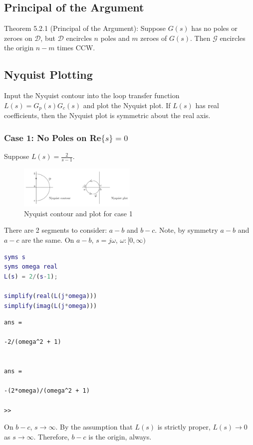 \documentclass[letterpaper,12pt]{article}
\begin{document}
\subsection{Principal of the Argument}
Theorem 5.2.1 (Principal of the Argument): Suppose $G(s)$ has no poles or zeroes on $\mathcal{D}$, but $\mathcal{D}$ encircles 
$n$ poles and $m$ zeroes of $G(s)$. Then $\mathcal{G}$ encircles the origin $n-m$ times CCW.

\subsection{Nyquist Plotting}
Input the Nyquist contour into the loop transfer function $L(s) = G_p(s) G_c(s)$ and plot the Nyquist plot. If $L(s)$ has real coefficients,
then the Nyquist plot is symmetric about the real axis.

\subsubsection{Case 1: No Poles on Re$\{s\} = 0$}
Suppose $L(s) = \frac{2}{s-1}$.
\begin{figure}[h]
    \centering
    \includegraphics[width=0.5\textwidth]{case1 nyquist plots.png}
    \caption{Nyquist contour and plot for case 1}
\end{figure}
There are 2 segments to consider: $a-b$ and $b-c$. Note, by symmetry $a-b$ and $a-c$ are the same. On $a-b$, $s= j\omega$, $\omega: [0, \infty)$ 
\begin{lstlisting}[language=Matlab]
syms s 
syms omega real
L(s) = 2/(s-1);

simplify(real(L(j*omega)))
simplify(imag(L(j*omega)))
\end{lstlisting}
\begin{verbatim}
ans =
 
-2/(omega^2 + 1)
 
 
ans =
 
-(2*omega)/(omega^2 + 1)
 
>> 
\end{verbatim}
On $b-c$, $s \to \infty$. By the assumption that $L(s)$ is strictly proper, $L(s) \to 0$ as $s \to \infty$. Therefore, $b-c$ is the origin, always.
\end{document}
